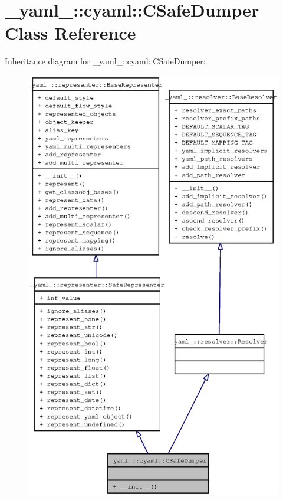 \section{\_\-yaml\_\-::cyaml::CSafeDumper Class Reference}
\label{class__yaml___1_1cyaml_1_1CSafeDumper}
Inheritance diagram for \_\-yaml\_\-::cyaml::CSafeDumper:\nopagebreak
\begin{figure}[H]
\begin{center}
\leavevmode
\includegraphics[width=400pt]{class__yaml___1_1cyaml_1_1CSafeDumper__inherit__graph}
\end{center}
\end{figure}
